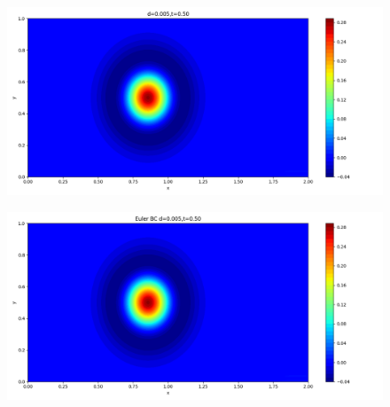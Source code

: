 \documentclass[12pt]{article}
\begin{document}
\begin{figure}[H]
\begin{minipage}{\linewidth}
\begin{minipage}{0.5\textwidth}
\includegraphics[width=\linewidth]{figures/3d0.005t0.50.png}
\label{fig3}
\end{minipage}\hfill
\begin{minipage}{0.5\textwidth}
\includegraphics[width=\linewidth]{figures/3Ed0.005t0.50.png}
\label{fig4}
\end{minipage}
\vspace{-1.5em}


\end{minipage}
\end{figure}
\end{document}
